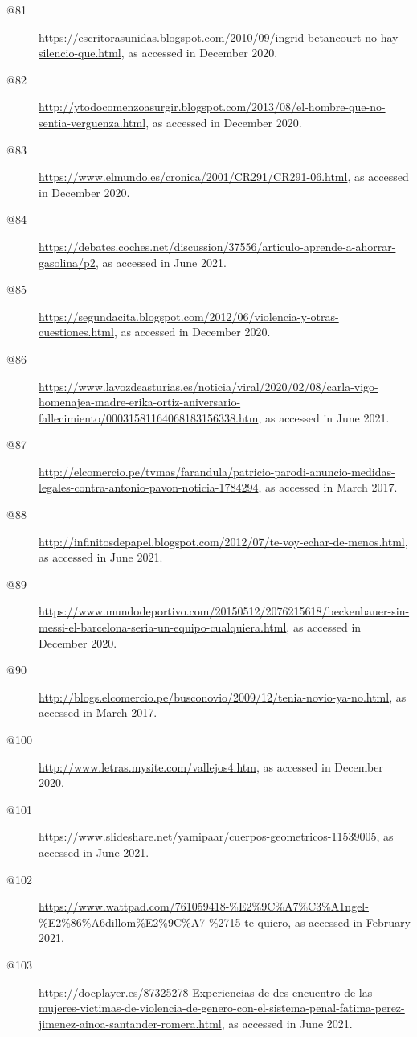 \begin{flushleft}
\begin{description}
\item[{{@81}}] { \url{https://escritorasunidas.blogspot.com/2010/09/ingrid-betancourt-no-hay-silencio-que.html}{, as accessed in December 2020.}}
\item[{{@82}}] { \url{http://ytodocomenzoasurgir.blogspot.com/2013/08/el-hombre-que-no-sentia-verguenza.html}{, as accessed in December 2020.}}
\item[{{@83}}] { \url{https://www.elmundo.es/cronica/2001/CR291/CR291-06.html}{, as accessed in December 2020.}}
\item[@84] \url{https://debates.coches.net/discussion/37556/articulo-aprende-a-ahorrar-gasolina/p2}, as accessed in June 2021.
\item[{{@85}}] { \url{https://segundacita.blogspot.com/2012/06/violencia-y-otras-cuestiones.html}{, as accessed in December 2020.}}
\item[{{@86}}] { \url{https://www.lavozdeasturias.es/noticia/viral/2020/02/08/carla-vigo-homenajea-madre-erika-ortiz-aniversario-fallecimiento/00031581164068183156338.htm}{, as accessed in June 2021.}}
\item[{{@87}}] { \url{http://elcomercio.pe/tvmas/farandula/patricio-parodi-anuncio-medidas-legales-contra-antonio-pavon-noticia-1784294}{, as accessed in March 2017.}}
\item[{{@88}}] { \url{http://infinitosdepapel.blogspot.com/2012/07/te-voy-echar-de-menos.html}{, as accessed in June 2021.}}
\item[{{@89}}] { \url{https://www.mundodeportivo.com/20150512/2076215618/beckenbauer-sin-messi-el-barcelona-seria-un-equipo-cualquiera.html}{, as accessed in December 2020.}}
\item[{{@90}}] { \url{http://blogs.elcomercio.pe/busconovio/2009/12/tenia-novio-ya-no.html}{, as accessed in March 2017.}}
\item[{{@100}}] { \url{http://www.letras.mysite.com/vallejos4.htm}{, as accessed in December 2020.}}
\item[{{@101}}] { \url{https://www.slideshare.net/yamipaar/cuerpos-geometricos-11539005}{, as accessed in June 2021.}}
\item[{{@102}}] { \url{https://www.wattpad.com/761059418-\%E2\%9C\%A7\%C3\%A1ngel-\%E2\%86\%A6dillom\%E2\%9C\%A7-\%2715-te-quiero}{, as accessed in February 2021.}}
\item[{{@103}}] { \url{https://docplayer.es/87325278-Experiencias-de-des-encuentro-de-las-mujeres-victimas-de-violencia-de-genero-con-el-sistema-penal-fatima-perez-jimenez-ainoa-santander-romera.html}{, as accessed in June 2021.}}

\end{description}
\end{flushleft}
